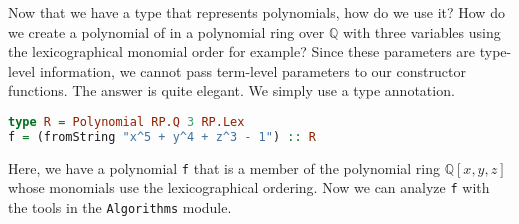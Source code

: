 \documentclass[MS, xcolor=dvipsnames]{wfuthesis}
\def\bQ{\mathbb{Q}}
\theoremstyle{definition}
\begin{document}
Now that we have a type that represents polynomials, how do we use it? How do we create a polynomial of in a polynomial ring over $\bQ$ with three variables using the lexicographical monomial order for example? Since these parameters are type-level information, we cannot pass term-level parameters to our constructor functions. The answer is quite elegant. We simply use a type annotation.
\begin{lstlisting}[language=Haskell]
type R = Polynomial RP.Q 3 RP.Lex
f = (fromString "x^5 + y^4 + z^3 - 1") :: R
\end{lstlisting}
Here, we have a polynomial \lstinline{f} that is a member of the polynomial ring $\bQ[x,y,z]$ whose monomials use the lexicographical ordering. Now we can analyze \lstinline{f} with the tools in the \lstinline{Algorithms} module.

\end{document}
